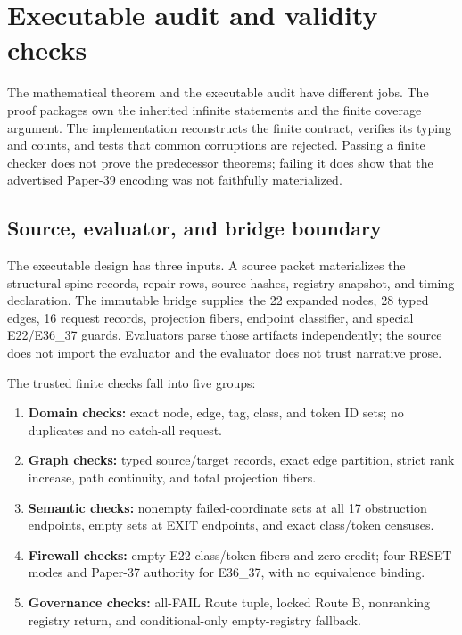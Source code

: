 \section{Executable audit and validity checks}
\label{sec:executable}

The mathematical theorem and the executable audit have different jobs.  The
proof packages own the inherited infinite statements and the finite coverage
argument.  The implementation reconstructs the finite contract, verifies its
typing and counts, and tests that common corruptions are rejected.  Passing a
finite checker does not prove the predecessor theorems; failing it does show
that the advertised Paper-39 encoding was not faithfully materialized.

\subsection{Source, evaluator, and bridge boundary}

The executable design has three inputs.  A source packet materializes the
structural-spine records, repair rows, source hashes, registry snapshot, and
timing declaration.  The immutable bridge supplies the 22 expanded nodes, 28
typed edges, 16 request records, projection fibers, endpoint classifier, and
special E22/E36\_37 guards.  Evaluators parse those artifacts independently;
the source does not import the evaluator and the evaluator does not trust
narrative prose.

The trusted finite checks fall into five groups:
\begin{enumerate}
  \item \textbf{Domain checks:} exact node, edge, tag, class, and token ID sets;
  no duplicates and no catch-all request.
  \item \textbf{Graph checks:} typed source/target records, exact edge
  partition, strict rank increase, path continuity, and total projection
  fibers.
  \item \textbf{Semantic checks:} nonempty failed-coordinate sets at all 17
  obstruction endpoints, empty sets at EXIT endpoints, and exact class/token
  censuses.
  \item \textbf{Firewall checks:} empty E22 class/token fibers and zero credit;
  four RESET modes and Paper-37 authority for E36\_37, with no equivalence
  binding.
  \item \textbf{Governance checks:} all-FAIL Route tuple, locked Route B,
  nonranking registry return, and conditional-only empty-registry fallback.
\end{enumerate}

